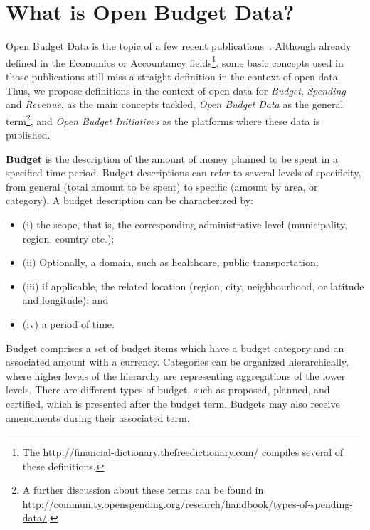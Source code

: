 \section{What is Open Budget Data?}
\label{sec:openbudgetdata} 

Open Budget Data is the topic of a few recent publications~\cite{Vlasov2014, Vafopoulos2014, Martin2013, OpenSpending2014, Chambers2012}.
Although already defined in the Economics or Accountancy fields\footnote{The \url{http://financial-dictionary.thefreedictionary.com/} compiles several of these definitions.}, some basic concepts used in those publications still miss a straight definition in the context of open data.
Thus, we propose definitions in the context of open data for \emph{Budget}, \emph{Spending} and \emph{Revenue}, as the main concepts tackled, \emph{Open Budget Data} as the general term\footnote{A further discussion about these terms can be found in \url{http://community.openspending.org/research/handbook/types-of-spending-data/}.}, and \emph{Open Budget Initiatives} as the platforms where these data is published.

\hspace{.8cm}
\begin{defn}
\textbf{Budget} is the description of the amount of money planned to be spent in a specified time period. 
Budget descriptions can refer to several levels of specificity, from general (total amount to be spent) to specific (amount by area, or category).
A budget description can be characterized by: 
\begin{itemize}
	\item (i) the scope, that is, the corresponding administrative level (municipality, region, country etc.); 
	\item (ii) Optionally, a domain, such as healthcare, public transportation; 
	\item (iii) if applicable, the related location (region, city, neighbourhood, or latitude and longitude); and 
	\item (iv) a period of time.
\end{itemize}
\end{defn}
Budget comprises a set of budget items which have a budget category and an associated amount with a currency. 
Categories can be organized hierarchically, where higher levels of the hierarchy are representing aggregations of the lower levels.
There are different types of budget, such as proposed, planned, and certified, which is presented after the budget term. 
Budgets may also receive amendments during their associated term.

